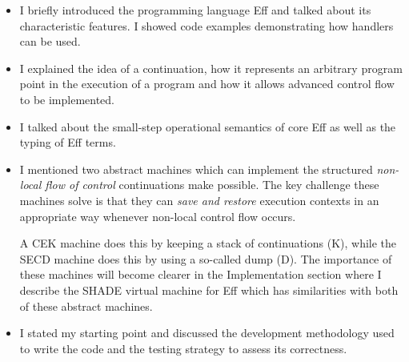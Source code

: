\documentclass[class=article, crop=false]{standalone}
\begin{document}
\begin{itemize}
  \item I briefly introduced the programming language Eff and talked about its
      characteristic features. I showed code examples demonstrating how handlers
      can be used.

  \item I explained the idea of a continuation, how it represents an arbitrary
      program point in the execution of a program and how it allows advanced
      control flow to be implemented.

  \item I talked about the small-step operational semantics of core Eff as well
      as the typing of Eff terms.

  \item I mentioned two abstract machines which can implement the structured
      \emph{non-local flow of control} continuations make possible. The key
      challenge these machines solve is that they can \emph{save and restore}
      execution contexts in an appropriate way whenever non-local control flow
      occurs.

    A CEK machine does this by keeping a stack of continuations (K), while the
    SECD machine does this by using a so-called dump (D). The importance of
    these machines will become clearer in the Implementation section where I
    describe the SHADE virtual machine for Eff which has similarities with both
    of these abstract machines.

  \item I stated my starting point and discussed the development methodology
    used to write the code and the testing strategy to assess its correctness.
\end{itemize}

\ifstandalone
{}

\fi
\end{document}

